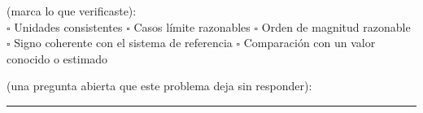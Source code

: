 \documentclass[11pt]{book}
\begin{document}
\vspace{1mm}
 (marca lo que verificaste):\\
$\square$ Unidades consistentes \quad
$\square$ Casos límite razonables \quad
$\square$ Orden de magnitud razonable\\
$\square$ Signo coherente con el sistema de referencia \quad
$\square$ Comparación con un valor conocido o estimado

\vspace{2mm}
 (una pregunta abierta que este problema deja sin responder):\\
\rule{\linewidth}{0.3pt}
\normalsize
\newpage



\end{document}
